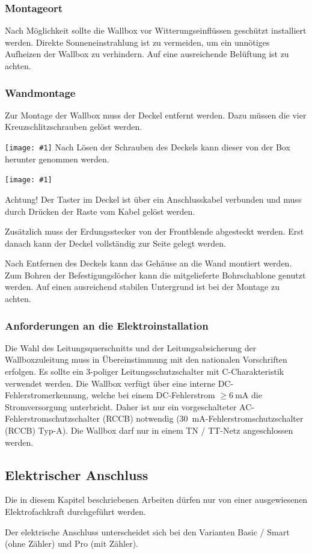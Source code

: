 \documentclass[a4paper,10pt]{article}
\newcommand{\hint}[1]{\begin{tcolorbox}[colback=boxgray,colframe=black,coltext=
white,title=Hinweis]#1\end{tcolorbox}}
\newcommand{\gfx}[1]{\texttt{[image: \#1]}}
\begin{document}
\begin{multicols*}{2}
	\subsubsection{Montageort}
	Nach Möglichkeit sollte die Wallbox vor Witterungseinflüssen geschützt
	installiert werden. Direkte Sonneneinstrahlung ist zu vermeiden, um ein
	unnötiges Aufheizen der Wallbox zu verhindern. Auf eine ausreichende Belüftung
	ist zu achten.

	\subsubsection{Wandmontage}\label{wandmontage}
	Zur Montage der Wallbox muss der Deckel entfernt werden. Dazu müssen die
	vier Kreuzschlitzschrauben gelöst werden.

	\gfx{./img_warp2/resized/warp_screw_points_ready}
	Nach Lösen der Schrauben des Deckels kann dieser von der Box herunter genommen
	werden.

	\gfx{./img_warp2/resized/warp2_button_and_gnd_600}

	\hint{Achtung! Der Taster im Deckel ist über ein Anschlusskabel verbunden und muss
		durch Drücken der Raste vom Kabel gelöst werden.}
	Zusätzlich muss der Erdungsstecker von der Frontblende abgesteckt werden.
	Erst danach kann der Deckel vollständig zur Seite gelegt werden.


	Nach Entfernen des Deckels kann das Gehäuse an die Wand montiert werden. Zum
	Bohren der Befestigungslöcher kann die mitgelieferte Bohrschablone genutzt
	werden. Auf einen ausreichend stabilen Untergrund ist bei der Montage zu
	achten.

	\subsubsection{Anforderungen an die Elektroinstallation}
	Die Wahl des Leitungsquerschnitts und der Leitungsabsicherung der
	Wallboxzuleitung muss in Übereinstimmung mit den nationalen Vorschriften
	erfolgen. Es sollte ein 3-poliger Leitungsschutzschalter mit C-Charakteristik
	verwendet werden.
	Die Wallbox verfügt über eine interne DC-Fehlerstromerkennung, welche
	bei einem DC-Fehlerstrom $\geq \SI{6}{\milli\ampere}$ die Stromversorgung
	unterbricht. Daher ist nur ein vorgeschalteter AC-Fehlerstromschutzschalter
	(RCCB) notwendig (\SI{30}{\milli\ampere}-Fehlerstromschutzschalter (RCCB) Typ-A).
	Die Wallbox darf nur in einem TN / TT-Netz angeschlossen werden.

	\newpage
	\subsection{Elektrischer Anschluss}
	\hint{Die in diesem Kapitel beschriebenen Arbeiten dürfen nur von einer ausgewiesenen
		Elektrofachkraft durchgeführt werden.}
	Der elektrische Anschluss unterscheidet sich bei den Varianten Basic / Smart
	(ohne Zähler) und Pro (mit Zähler).


\end{multicols*}
\end{document}
